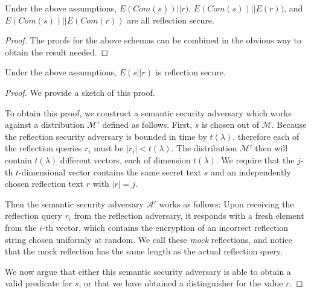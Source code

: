 \begin{lemma}
    Under the above assumptions, $E(Com(s)) || r)$, \break$E(Com(s)) || E(r))$, and
    $E(Com(s)) || E(Com(r))$ are all reflection secure.
\end{lemma}

\begin{proof}
    The proofs for the above schemas can be combined in the obvious way to
    obtain the result needed.
\end{proof}

\begin{lemma}
    Under the above assumptions, $E(s || r)$ is reflection secure.
\end{lemma}

\begin{proof}
    We provide a sketch of this proof.

    To obtain this proof, we construct a semantic security adversary which
    works against a distribution $\mathcal{M'}$ defined as follows. First, $s$
    is chosen out of $\mathcal{M}$. Because the reflection security adversary
    is bounded in time by $t(\lambda)$, therefore each of the reflection
    queries $r_i$ must be $|r_i| < t(\lambda)$. The distribution $\mathcal{M'}$
    then will contain $t(\lambda)$ different vectors, each of dimension
    $t(\lambda)$. We require that the $j$-th $t$-dimensional vector contains
    the same secret text $s$ and an independently chosen reflection text $r$
    with $|r| = j$.

    Then the semantic security adversary $\mathcal{A'}$ works as follows: Upon
    receiving the reflection query $r_i$ from the reflection adversary, it
    responds with a fresh element from the $i$-th vector, which contains the
    encryption of an incorrect reflection string chosen uniformly at random. We
    call these \textit{mock} reflections, and notice that the mock reflection
    has the same length as the actual reflection query.

    We now argue that either this semantic security adversary is able to obtain
    a valid predicate for $s$, or that we have obtained a distinguisher for the
    value $r$.


\end{proof}
